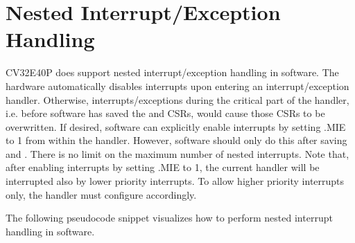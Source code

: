 \documentclass[letterpaper,10pt,english]{sphinxmanual}
\begin{document}
\section{Nested Interrupt/Exception Handling}
\label{\detokenize{exceptions_interrupts:nested-interrupt-exception-handling}}
\sphinxAtStartPar
CV32E40P does support nested interrupt/exception handling in software.
The hardware automatically disables interrupts upon entering an interrupt/exception handler.
Otherwise, interrupts/exceptions during the critical part of the handler, i.e. before software has saved the  and  CSRs, would cause those CSRs to be overwritten.
If desired, software can explicitly enable interrupts by setting .MIE to 1 from within the handler.
However, software should only do this after saving  and .
There is no limit on the maximum number of nested interrupts.
Note that, after enabling interrupts by setting .MIE to 1, the current handler will be interrupted also by lower priority interrupts.
To allow higher priority interrupts only, the handler must configure  accordingly.

\sphinxAtStartPar
The following pseudo\sphinxhyphen{}code snippet visualizes how to perform nested interrupt handling in software.
\end{document}
